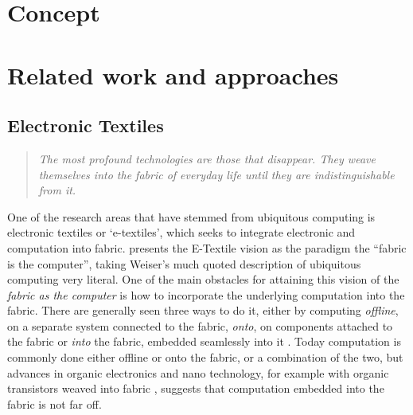 \section{Concept}
\section{Related work and approaches}
\subsection{Electronic Textiles}
\begin{quotation}
\emph{The most profound technologies are those that disappear. They weave themselves into the fabric of everyday life until they are indistinguishable from it. \citep{weiser1991computer}}
\end{quotation}
One of the research areas that have stemmed from ubiquitous computing is electronic textiles or `e-textiles', which seeks to integrate electronic and computation into fabric.
\citet{park2002wearable} presents the E-Textile vision as the paradigm the ``fabric is the computer'', taking Weiser's much quoted description of ubiquitous computing very literal.
One of the main obstacles for attaining this vision of the \emph{fabric as the computer} is how to incorporate the underlying computation into the fabric.
There are generally seen three ways to do it, either by computing \emph{offline}, on a separate system connected to the fabric, \emph{onto}, on components attached to the fabric or \emph{into} the fabric, embedded seamlessly into it \citep{marculescu2003}.
Today computation is commonly done either offline or onto the fabric, or a combination of the two, but advances in organic electronics and nano technology, for example with organic transistors weaved into fabric \citep{lee2005weave}, suggests that computation embedded into the fabric is not far off.

